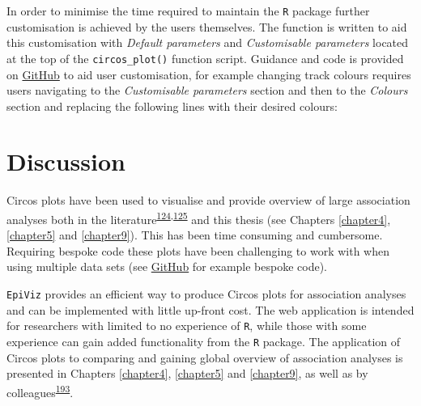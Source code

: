 \documentclass[11pt,twoside]{bristolthesis}
\newenvironment{Shaded}{\begin{snugshade}}{\end{snugshade}}
\newcommand{\CommentTok}[1]{\textcolor[rgb]{0.56,0.35,0.01}{\textit{#1}}}
\newcommand{\KeywordTok}[1]{\textcolor[rgb]{0.13,0.29,0.53}{\textbf{#1}}}
\newcommand{\NormalTok}[1]{#1}
\newcommand{\StringTok}[1]{\textcolor[rgb]{0.31,0.60,0.02}{#1}}
\begin{document}
In order to minimise the time required to maintain the \texttt{R} package further customisation is achieved by the users themselves. The function is written to aid this customisation with \emph{Default parameters} and \emph{Customisable parameters} located at the top of the \texttt{circos\_plot()} function script. Guidance and code is provided on \href{https://github.com/mattlee821/EpiViz/tree/master/R_package}{GitHub} to aid user customisation, for example changing track colours requires users navigating to the \emph{Customisable parameters} section and then to the \emph{Colours} section and replacing the following lines with their desired colours:
\begin{Shaded}
\end{Shaded}
\hypertarget{discussion}{%
\section{Discussion}\label{discussion}}

Circos plots have been used to visualise and provide overview of large association analyses both in the literature\textsuperscript{\protect\hyperlink{ref-Shin2014}{124},\protect\hyperlink{ref-Kettunen2016}{125}} and this thesis (see Chapters \ref{chapter4}, \ref{chapter5} and \ref{chapter9}). This has been time consuming and cumbersome. Requiring bespoke code these plots have been challenging to work with when using multiple data sets (see \href{https://github.com/mattlee821/000_thesis/tree/master/index/data/chapter6/code/circos_example.R}{GitHub} for example bespoke code).

\texttt{EpiViz} provides an efficient way to produce Circos plots for association analyses and can be implemented with little up-front cost. The web application is intended for researchers with limited to no experience of \texttt{R}, while those with some experience can gain added functionality from the \texttt{R} package. The application of Circos plots to comparing and gaining global overview of association analyses is presented in Chapters \ref{chapter4}, \ref{chapter5} and \ref{chapter9}, as well as by colleagues\textsuperscript{\protect\hyperlink{ref-Taylor2019}{193}}.
\end{document}
